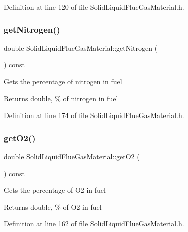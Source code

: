 Definition at line 120 of file Solid\+Liquid\+Flue\+Gas\+Material.\+h.

\mbox{\label{class_solid_liquid_flue_gas_material_a76159a5d9d609f0e0131f7bca3b60ebc}} 
\subsubsection{\texorpdfstring{get\+Nitrogen()}{getNitrogen()}}
{\footnotesize\ttfamily double Solid\+Liquid\+Flue\+Gas\+Material\+::get\+Nitrogen (\begin{DoxyParamCaption}{ }\end{DoxyParamCaption}) const\hspace{0.3cm}{\ttfamily [inline]}}

Gets the percentage of nitrogen in fuel \begin{DoxyReturn}{Returns}
double, \% of nitrogen in fuel 
\end{DoxyReturn}


Definition at line 174 of file Solid\+Liquid\+Flue\+Gas\+Material.\+h.

\mbox{\label{class_solid_liquid_flue_gas_material_a08d588e576f605d3f9925cb649e1105e}} 
\subsubsection{\texorpdfstring{get\+O2()}{getO2()}}
{\footnotesize\ttfamily double Solid\+Liquid\+Flue\+Gas\+Material\+::get\+O2 (\begin{DoxyParamCaption}{ }\end{DoxyParamCaption}) const\hspace{0.3cm}{\ttfamily [inline]}}

Gets the percentage of O2 in fuel \begin{DoxyReturn}{Returns}
double, \% of O2 in fuel 
\end{DoxyReturn}


Definition at line 162 of file Solid\+Liquid\+Flue\+Gas\+Material.\+h.

